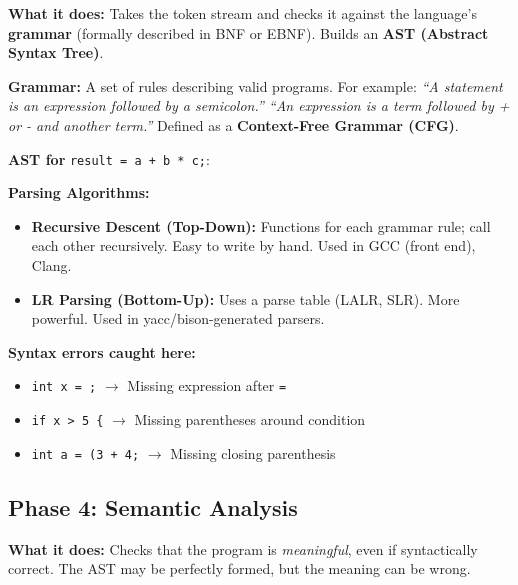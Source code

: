 \documentclass[11pt,a4paper]{article}
\newcommand{\code}[1]{\texttt{\small\colorbox{codebg}{\color{codekw}#1}}}
\newcommand{\term}[1]{\textbf{\color{darkblue}#1}}
\begin{document}
\textbf{What it does:} Takes the token stream and checks it against the language's \term{grammar} (formally described in BNF or EBNF). Builds an \term{AST (Abstract Syntax Tree)}.

\textbf{Grammar:} A set of rules describing valid programs. For example: \textit{``A statement is an expression followed by a semicolon.'' ``An expression is a term followed by + or - and another term.''} Defined as a \term{Context-Free Grammar (CFG)}.

\textbf{AST for} \code{result = a + b * c;}:
\begin{center}
\end{center}

\textbf{Parsing Algorithms:}
\begin{itemize}[noitemsep]
  \item \term{Recursive Descent (Top-Down):} Functions for each grammar rule; call each other recursively. Easy to write by hand. Used in GCC (front end), Clang.
  \item \term{LR Parsing (Bottom-Up):} Uses a parse table (LALR, SLR). More powerful. Used in yacc/bison-generated parsers.
\end{itemize}

\textbf{Syntax errors caught here:}
\begin{itemize}[noitemsep]
  \item \code{int x = ;} $\to$ Missing expression after \code{=}
  \item \code{if x > 5 \{} $\to$ Missing parentheses around condition
  \item \code{int a = (3 + 4;} $\to$ Missing closing parenthesis
\end{itemize}

\subsection{Phase 4: Semantic Analysis}

\textbf{What it does:} Checks that the program is \textit{meaningful}, even if syntactically correct. The AST may be perfectly formed, but the meaning can be wrong.
\end{document}
